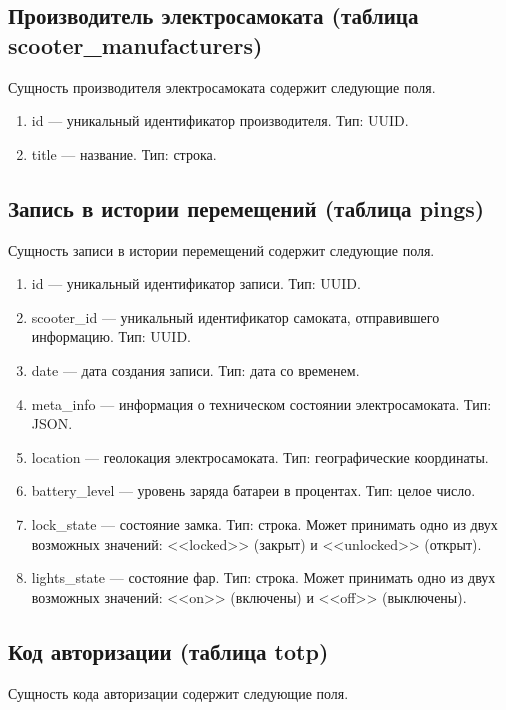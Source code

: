 \subsection{Производитель электросамоката (таблица scooter\_manufacturers)}

Сущность производителя электросамоката содержит следующие поля.

\begin{enumerate}
    \item id --- уникальный идентификатор производителя. Тип: UUID.
    \item title --- название. Тип: строка.
\end{enumerate}

\subsection{Запись в истории перемещений (таблица pings)}

Сущность записи в истории перемещений содержит следующие поля.

\begin{enumerate}
    \item id --- уникальный идентификатор записи. Тип: UUID. 
    \item scooter\_id --- уникальный идентификатор самоката, отправившего информацию. Тип: UUID. 
    \item date --- дата создания записи. Тип: дата со временем. 
    \item meta\_info --- информация о техническом состоянии электросамоката. Тип: JSON. 
    \item location --- геолокация электросамоката. Тип: географические координаты. 
    \item battery\_level --- уровень заряда батареи в процентах. Тип: целое число. 
    \item lock\_state --- состояние замка. Тип: строка. Может принимать одно из двух возможных значений: <<locked>> (закрыт) и <<unlocked>> (открыт). 
    \item lights\_state --- состояние фар. Тип: строка. Может принимать одно из двух возможных значений: <<on>> (включены) и <<off>> (выключены). 
\end{enumerate}

\subsection{Код авторизации (таблица totp)}

Сущность кода авторизации содержит следующие поля.

